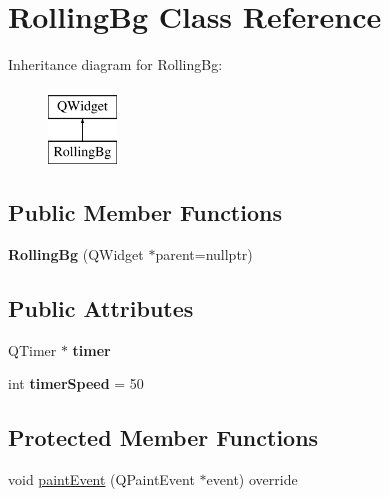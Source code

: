 \hypertarget{classRollingBg}{\section{Rolling\-Bg Class Reference}
\label{classRollingBg}
}
Inheritance diagram for Rolling\-Bg\-:\begin{figure}[H]
\begin{center}
\leavevmode
\includegraphics[height=2.000000cm]{classRollingBg}
\end{center}
\end{figure}
\subsection*{Public Member Functions}
\begin{DoxyCompactItemize}
\item 
\hypertarget{classRollingBg_ab26828e307d50620a0a6f03fcbb2e591}{{\bfseries Rolling\-Bg} (Q\-Widget $\ast$parent=nullptr)}\label{classRollingBg_ab26828e307d50620a0a6f03fcbb2e591}

\end{DoxyCompactItemize}
\subsection*{Public Attributes}
\begin{DoxyCompactItemize}
\item 
\hypertarget{classRollingBg_a254dd1f63ac2d916290f477d34099841}{Q\-Timer $\ast$ {\bfseries timer}}\label{classRollingBg_a254dd1f63ac2d916290f477d34099841}

\item 
\hypertarget{classRollingBg_a40c01dec8cb9774ddfd80e3522c1cf82}{int {\bfseries timer\-Speed} = 50}\label{classRollingBg_a40c01dec8cb9774ddfd80e3522c1cf82}

\end{DoxyCompactItemize}
\subsection*{Protected Member Functions}
\begin{DoxyCompactItemize}
\item 
void \hyperlink{classRollingBg_adaae6dcc6b9b655bc76bfe06802482d5}{paint\-Event} (Q\-Paint\-Event $\ast$event) override
\end{DoxyCompactItemize}


